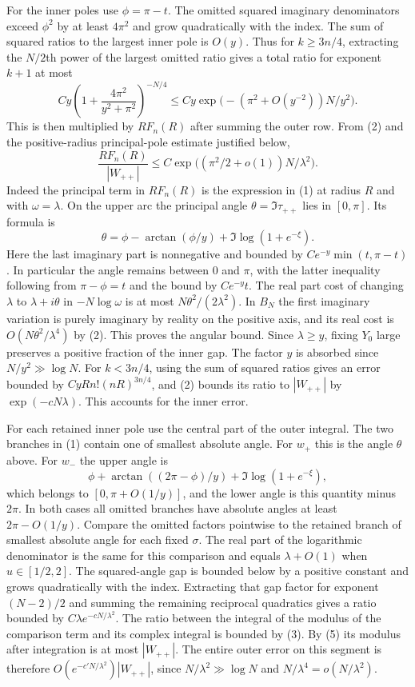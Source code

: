 \documentclass[11pt]{article}
\begin{document}
For the inner poles use $\phi=\pi-t$. The omitted squared imaginary denominators exceed $\phi^2$ by at least $4\pi^2$ and grow quadratically with the index. The sum of squared ratios to the largest inner pole is $O(y)$. Thus for $k\ge3n/4$, extracting the $N/2$th power of the largest omitted ratio gives a total ratio for exponent $k+1$ at most
\[
 Cy\left(1+\frac{4\pi^2}{y^2+\pi^2}\right)^{-N/4}
 \le Cy \exp\big(-(\pi^2+O(y^{-2}))N/y^2\big).
\]
This is then multiplied by $R F_n(R)$ after summing the outer row. From (2) and the positive-radius principal-pole estimate justified below,
\[
 \frac{R F_n(R)}{|W_{++}|}
 \le C\exp\big((\pi^2/2+o(1))N/\lambda^2\big).
\]
Indeed the principal term in $R F_n(R)$ is the expression in (1) at radius $R$ and with $\omega=\lambda$. On the upper arc the principal angle $\theta=\Im\tau_{++}$ lies in $[0,\pi]$. Its formula is
\[
 \theta=\phi-\arctan(\phi/y)+\Im\log(1+e^{-\xi}).
\]
Here the last imaginary part is nonnegative and bounded by $C e^{-y}\min(t,\pi-t)$. In particular the angle remains between $0$ and $\pi$, with the latter inequality following from $\pi-\phi=t$ and the bound by $Ce^{-y}t$. The real part cost of changing $\lambda$ to $\lambda+i\theta$ in $-N\log\omega$ is at most $N\theta^2/(2\lambda^2)$. In $B_N$ the first imaginary variation is purely imaginary by reality on the positive axis, and its real cost is $O(N\theta^2/\lambda^4)$ by (2). This proves the angular bound. Since $\lambda\ge y$, fixing $Y_0$ large preserves a positive fraction of the inner gap. The factor $y$ is absorbed since $N/y^2\gg\log N$. For $k<3n/4$, using the sum of squared ratios gives an error bounded by $CyR n!(nR)^{3n/4}$, and (2) bounds its ratio to $|W_{++}|$ by $\exp(-cN\lambda)$. This accounts for the inner error.

For each retained inner pole use the central part of the outer integral. The two branches in (1) contain one of smallest absolute angle. For $w_+$ this is the angle $\theta$ above. For $w_-$ the upper angle is
\[
 \phi+\arctan((2\pi-\phi)/y)+\Im\log(1+e^{-\xi}),
\]
which belongs to $[0,\pi+O(1/y)]$, and the lower angle is this quantity minus $2\pi$. In both cases all omitted branches have absolute angles at least $2\pi-O(1/y)$. Compare the omitted factors pointwise to the retained branch of smallest absolute angle for each fixed $\sigma$. The real part of the logarithmic denominator is the same for this comparison and equals $\lambda+O(1)$ when $u\in[1/2,2]$. The squared-angle gap is bounded below by a positive constant and grows quadratically with the index. Extracting that gap factor for exponent $(N-2)/2$ and summing the remaining reciprocal quadratics gives a ratio bounded by $C\lambda e^{-cN/\lambda^2}$. The ratio between the integral of the modulus of the comparison term and its complex integral is bounded by (3). By (5) its modulus after integration is at most $|W_{++}|$. The entire outer error on this segment is therefore $O(e^{-c'N/\lambda^2})|W_{++}|$, since $N/\lambda^2\gg \log N$ and $N/\lambda^4=o(N/\lambda^2)$.
\end{document}
